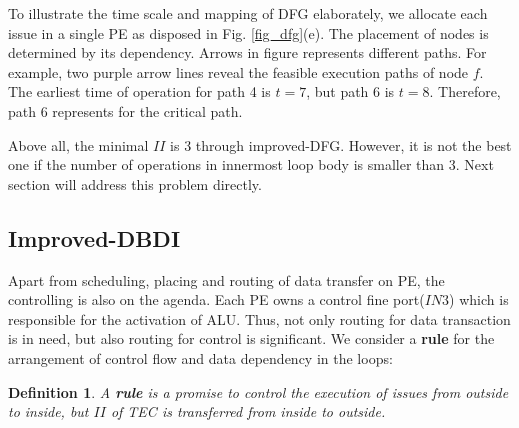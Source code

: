 \documentclass[10pt, conference, compsocconf]{IEEEtran}
\newtheorem{defn}{Definition}
\begin{document}
To illustrate the time scale and mapping of DFG elaborately, we allocate each issue in a single PE as disposed in Fig. \ref{fig_dfg}(e). The placement of nodes is determined by its dependency. Arrows in figure represents different paths. For example, two purple arrow lines reveal the feasible execution paths of node $f$. The earliest time of operation for path 4 is $t=7$, but path 6 is $t=8$. Therefore, path 6 represents for the critical path.

Above all, the minimal $II$ is 3 through improved-DFG. However, it is not the best one if the number of operations in innermost loop body is smaller than 3. Next section will address this problem directly.

%

\subsection{Improved-DBDI}
Apart from scheduling, placing and routing of data transfer on PE, the controlling is also on the agenda. Each PE owns a control fine port($IN3$) which is responsible for the activation of ALU. Thus, not only routing for data transaction is in need, but also routing for control is significant. We consider a \textbf{rule} for the arrangement of control flow and data dependency in the loops:
\begin{defn}A \textbf{rule} is a promise to control the execution of issues from outside to inside, but $II$ of TEC is transferred from inside to outside.
\end{defn}
\end{document}
